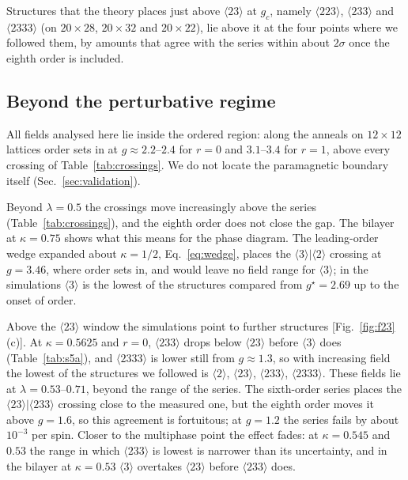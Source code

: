 \documentclass[
 aps,prb,
 twocolumn,
 superscriptaddress,
 longbibliography,
 nofootinbib,
 floatfix
]{revtex4-2}
\begin{document}
Structures that the theory places just above $\langle23\rangle$ at $g_c$, namely $\langle223\rangle$, $\langle233\rangle$ and
$\langle2333\rangle$ (on $20\times28$, $20\times32$ and $20\times22$), lie above it at the four points where we followed
them, by amounts that agree with the series within about $2\sigma$ once the eighth order is included.



\subsection{Beyond the perturbative regime}
\label{sec:res_beyond}

All fields analysed here lie inside the ordered region: along the anneals on $12\times12$ lattices order sets in at
$g\approx2.2$--$2.4$ for $r=0$ and $3.1$--$3.4$ for $r=1$, above every crossing of Table~\ref{tab:crossings}. We do not
locate the paramagnetic boundary itself (Sec.~\ref{sec:validation}).

Beyond $\lambda=0.5$ the crossings move increasingly above the series (Table~\ref{tab:crossings}), and the eighth
order does not close the gap. The bilayer at $\kappa=0.75$ shows what this means for the phase diagram. The
leading-order wedge expanded about $\kappa=1/2$, Eq.~\eqref{eq:wedge}, places the $\langle3\rangle|\langle2\rangle$ crossing at
$g=3.46$, where order
sets in, and would leave no field range for $\langle3\rangle$; in the simulations $\langle3\rangle$ is the lowest of the
structures compared from $g^\star=2.69$ up to the onset of order.

Above the $\langle23\rangle$ window the simulations point to further structures [Fig.~\ref{fig:f23}(c)].
At $\kappa=0.5625$ and $r=0$, $\langle233\rangle$ drops below $\langle23\rangle$ before $\langle3\rangle$ does
(Table~\ref{tab:s5a}), and $\langle2333\rangle$ is lower still from $g\approx1.3$, so with increasing field the lowest of
the structures we followed is $\langle2\rangle$, $\langle23\rangle$, $\langle233\rangle$, $\langle2333\rangle$. These
fields lie at $\lambda=0.53$--$0.71$, beyond the range of the series. The sixth-order series places the
$\langle23\rangle|\langle233\rangle$ crossing close to the measured one, but the eighth order moves it above $g=1.6$, so
this agreement is fortuitous; at $g=1.2$ the series fails by about $10^{-3}$ per spin.
Closer to the multiphase point the effect fades: at $\kappa=0.545$ and $0.53$ the range in which $\langle233\rangle$ is
lowest is narrower than its uncertainty, and in the bilayer at $\kappa=0.53$ $\langle3\rangle$ overtakes
$\langle23\rangle$ before $\langle233\rangle$ does.
\end{document}

